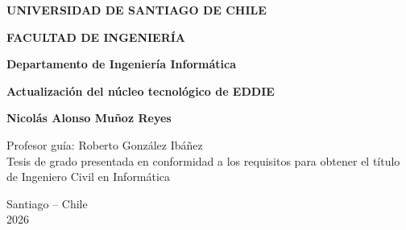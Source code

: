 \documentclass[12pt,letterpaper,oneside]{report}
\begin{document}
\begin{titlepage}
\centering
{\large\bfseries UNIVERSIDAD DE SANTIAGO DE CHILE\par}
{\bfseries FACULTAD DE INGENIERÍA\par}
{\bfseries Departamento de Ingeniería Informática\par}
\vspace{5cm}
{\Large\bfseries Actualización del núcleo tecnológico de EDDIE\par}
\vspace{3cm}
{\bfseries Nicolás Alonso Muñoz Reyes\par}
\vfill
\begin{flushright}
\begin{minipage}{7.5cm}
Profesor guía: Roberto González Ibáñez\\[1.5em]
Tesis de grado presentada en conformidad a los requisitos para obtener el título de Ingeniero Civil en Informática
\end{minipage}
\end{flushright}
\vspace{2cm}
Santiago -- Chile\\2026
\end{titlepage}


\tableofcontents
\listoftables
\listoffigures
\listofalgorithms

\cleardoublepage
{}











\appendix

\end{document}
